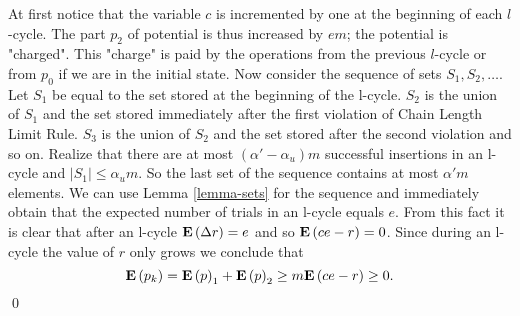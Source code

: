 At first notice that the variable $c$ is incremented by one at the beginning of each $l$-cycle. The part $p_2$ of potential is thus increased by $em$; the potential is "charged". This "charge" is paid by the operations from the previous $l$-cycle or from $p_0$ if we are in the initial state. Now consider the sequence of sets $S_1, S_2, \dots$. Let $S_1$ be equal to the set stored at the beginning of the l-cycle. $S_2$ is the union of $S_1$ and the set stored immediately after the first violation of Chain Length Limit Rule. $S_3$ is the union of $S_2$ and the set stored after the second violation and so on. Realize that there are at most $(\alpha' - \alpha_u)m$ successful insertions in an l-cycle and $|S_1| \leq \alpha_u m$. So the last set of the sequence contains at most $\alpha'm$ elements. We can use Lemma \ref{lemma-sets} for the sequence and immediately obtain that the expected number of trials in an l-cycle equals $e$. From this fact it is clear that after an l-cycle $\mathbf{E}\left(\Delta r\right) = e$ and so $\mathbf{E}\left(ce - r\right) = 0$. Since during an l-cycle the value of $r$ only grows we conclude that
\[
\mathbf{E}\left(p_k\right) = \mathbf{E}\left(p\right)_1 + \mathbf{E}\left(p\right)_2 \geq m\mathbf{E}\left(ce - r\right) \geq 0.
\]
\qed